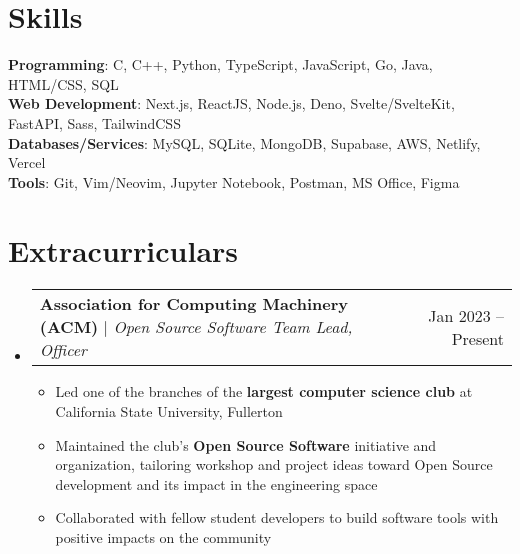 \documentclass[letterpaper,11pt]{article}
\makeatletter
\newcommand{\resumeItem}[1]{
  \item\small{
    {#1 \vspace{-2pt}}
  }
}
\newcommand{\resumeProjectHeading}[2]{
  \item
  \begin{tabular*}{0.97\textwidth}{l@{\extracolsep{\fill}}r}
    \small#1 & #2 \\
  \end{tabular*}\vspace{-7pt}
}
\newcommand{\resumeSubHeadingListStart}{\begin{itemize}[leftmargin=0.15in,
      label={}]}
\newcommand{\resumeSubHeadingListEnd}{\end{itemize}}
\newcommand{\resumeItemListStart}{\begin{itemize}}
\newcommand{\resumeItemListEnd}{\end{itemize}\vspace{-5pt}}
\makeatother
\begin{document}
\section{Skills}
\begin{itemize}[leftmargin=0.15in, label={}]
  \small{\item{
                \textbf{Programming}{: C, C++, Python, TypeScript, JavaScript, Go, Java,
                  HTML/CSS, SQL} \\
                \textbf{Web Development}{: Next.js, ReactJS, Node.js, Deno,
                  Svelte/SvelteKit, FastAPI, Sass, TailwindCSS} \\
                \textbf{Databases/Services}{: MySQL, SQLite, MongoDB, Supabase, AWS,
                  Netlify, Vercel} \\
                \textbf{Tools}{: Git, Vim/Neovim, Jupyter Notebook, Postman, MS Office,
                  Figma}
          }}
\end{itemize}

\section{Extracurriculars}
\resumeSubHeadingListStart
\resumeProjectHeading
{\textbf{Association for Computing Machinery (ACM)} $|$
  \footnotesize\emph{Open Source Software Team Lead, Officer}}{Jan 2023
  -- Present}
\resumeItemListStart
\resumeItem{Led one of the branches of the \textbf{largest computer
    science club} at California State University, Fullerton}
\resumeItem{Maintained the club's \textbf{Open Source Software}
  initiative and organization, tailoring workshop and project ideas toward Open
  Source development and its impact in the engineering space}
\resumeItem{Collaborated with fellow student developers to build
  software tools with positive impacts on the community}
\resumeItemListEnd
\resumeSubHeadingListEnd
\end{document}
